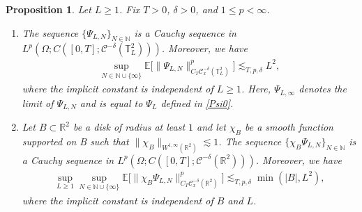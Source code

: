 \documentclass[letterpaper, 11pt,  reqno]{amsart}
\newtheorem{proposition}[theorem]{Proposition}
\theoremstyle{myremark}
\newcommand{\1}{\hspace{0.5mm}\text{I}\hspace{0.5mm}}
\newcommand{\R}{\mathbb{R}}
\newcommand{\T}{\mathbb{T}}
\newcommand{\CC}{\mathcal{C}}
\newcommand{\E}{\mathbb{E}}
\newcommand{\dl}{\delta}
\renewcommand{\O}{\Omega}
\newcommand{\les}{\lesssim}
\newcommand{\N}{\mathbb{N}}
\numberwithin{equation}{section}
\numberwithin{theorem}{section}
\begin{document}
 \begin{proposition}\label{PROP:psi}
Let $L\ge 1$. Fix $T>0$, $\dl > 0$,  and $1 \le p < \infty$. %
\begin{enumerate}
\item The sequence
$ \{\Psi_{L, N} \}_{N \in \N}$ is a Cauchy sequence in $L^p(\O;C([0,T]; \CC^{-\dl}(\T_L^2)))$.
Moreover, we have 
\begin{align}
\sup_{N \in \N\cup\{\infty\}}  \E\Big[ \|\Psi_{L, N}\|_{C_T \CC_x^{-\dl }(\T^2_L)}^p \Big] 
\les_{T, p, \dl} L^2,
\label{GX0a}
\end{align}
where the implicit constant is independent of $L \ge 1$. Here, $\Psi_{L, \infty}$ denotes the limit of $\Psi_{L, N}$
and is equal to $\Psi_L$ defined in \eqref{Psi0}.

\item Let $B \subset \R^2$ be a disk of radius at least $1$ and let $\chi_B$ be a smooth function supported on B such that $\|\chi_B\|_{W^{1,\infty}(\R^2)} \les 1$. The sequence
$ \{\chi_B \Psi_{L, N} \}_{N \in \N}$ is a Cauchy sequence in $L^p(\O;C([0,T]; \CC^{-\dl}(\R^2)))$. 
Moreover, we have 
\begin{align}
\sup_{L \ge 1} \sup_{N \in \N\cup\{\infty\}}  \E\Big[ \| \chi_B \Psi_{L, N}\|_{C_T \CC_x^{-\dl}(\R^2)}^p \Big] 
\les_{T, p, \dl} \min(|B|,L^2),
\label{GX0b}
\end{align}
where the  implicit constant is independent of $B$ and $L$.
\end{enumerate}
\end{proposition}
\end{document}
